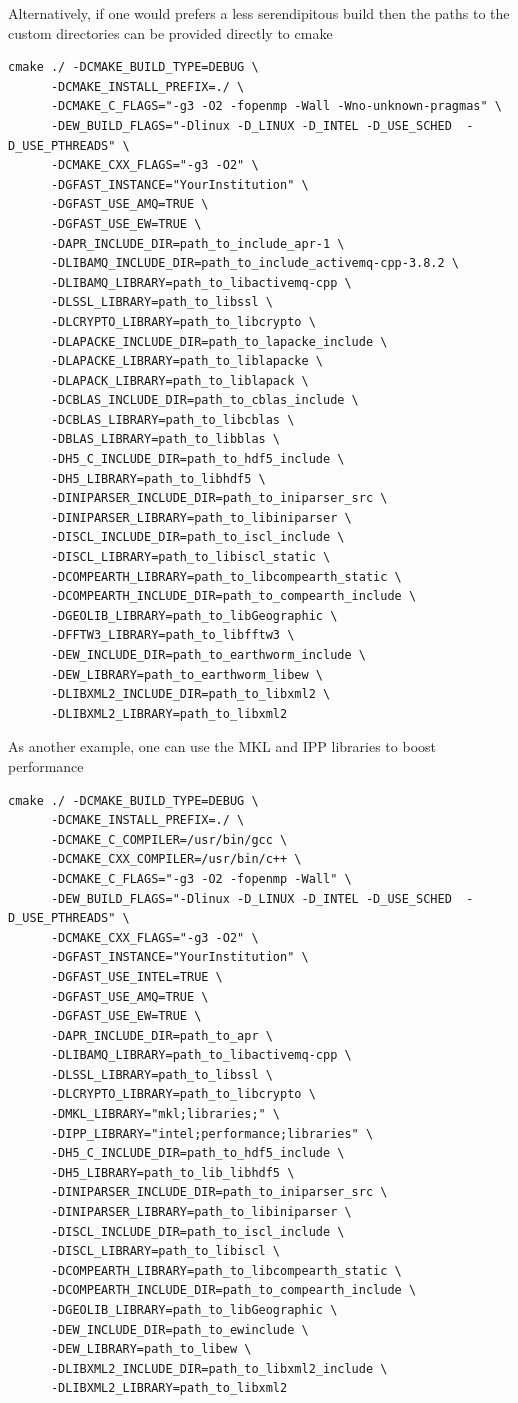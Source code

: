\documentclass[12pt]{article}
\begin{document}
Alternatively, if one would prefers a less serendipitous build then the paths to the custom
directories can be provided directly to cmake  
\begin{verbatim}
cmake ./ -DCMAKE_BUILD_TYPE=DEBUG \
      -DCMAKE_INSTALL_PREFIX=./ \
      -DCMAKE_C_FLAGS="-g3 -O2 -fopenmp -Wall -Wno-unknown-pragmas" \
      -DEW_BUILD_FLAGS="-Dlinux -D_LINUX -D_INTEL -D_USE_SCHED  -D_USE_PTHREADS" \
      -DCMAKE_CXX_FLAGS="-g3 -O2" \
      -DGFAST_INSTANCE="YourInstitution" \
      -DGFAST_USE_AMQ=TRUE \
      -DGFAST_USE_EW=TRUE \      
      -DAPR_INCLUDE_DIR=path_to_include_apr-1 \
      -DLIBAMQ_INCLUDE_DIR=path_to_include_activemq-cpp-3.8.2 \
      -DLIBAMQ_LIBRARY=path_to_libactivemq-cpp \
      -DLSSL_LIBRARY=path_to_libssl \
      -DLCRYPTO_LIBRARY=path_to_libcrypto \
      -DLAPACKE_INCLUDE_DIR=path_to_lapacke_include \
      -DLAPACKE_LIBRARY=path_to_liblapacke \
      -DLAPACK_LIBRARY=path_to_liblapack \
      -DCBLAS_INCLUDE_DIR=path_to_cblas_include \
      -DCBLAS_LIBRARY=path_to_libcblas \
      -DBLAS_LIBRARY=path_to_libblas \
      -DH5_C_INCLUDE_DIR=path_to_hdf5_include \
      -DH5_LIBRARY=path_to_libhdf5 \
      -DINIPARSER_INCLUDE_DIR=path_to_iniparser_src \
      -DINIPARSER_LIBRARY=path_to_libiniparser \
      -DISCL_INCLUDE_DIR=path_to_iscl_include \
      -DISCL_LIBRARY=path_to_libiscl_static \
      -DCOMPEARTH_LIBRARY=path_to_libcompearth_static \
      -DCOMPEARTH_INCLUDE_DIR=path_to_compearth_include \
      -DGEOLIB_LIBRARY=path_to_libGeographic \
      -DFFTW3_LIBRARY=path_to_libfftw3 \
      -DEW_INCLUDE_DIR=path_to_earthworm_include \
      -DEW_LIBRARY=path_to_earthworm_libew \
      -DLIBXML2_INCLUDE_DIR=path_to_libxml2 \
      -DLIBXML2_LIBRARY=path_to_libxml2
\end{verbatim}
As another example, one can use the MKL and IPP libraries to boost performance 
\begin{verbatim}
cmake ./ -DCMAKE_BUILD_TYPE=DEBUG \
      -DCMAKE_INSTALL_PREFIX=./ \
      -DCMAKE_C_COMPILER=/usr/bin/gcc \
      -DCMAKE_CXX_COMPILER=/usr/bin/c++ \
      -DCMAKE_C_FLAGS="-g3 -O2 -fopenmp -Wall" \
      -DEW_BUILD_FLAGS="-Dlinux -D_LINUX -D_INTEL -D_USE_SCHED  -D_USE_PTHREADS" \
      -DCMAKE_CXX_FLAGS="-g3 -O2" \
      -DGFAST_INSTANCE="YourInstitution" \
      -DGFAST_USE_INTEL=TRUE \
      -DGFAST_USE_AMQ=TRUE \
      -DGFAST_USE_EW=TRUE \      
      -DAPR_INCLUDE_DIR=path_to_apr \
      -DLIBAMQ_LIBRARY=path_to_libactivemq-cpp \
      -DLSSL_LIBRARY=path_to_libssl \
      -DLCRYPTO_LIBRARY=path_to_libcrypto \
      -DMKL_LIBRARY="mkl;libraries;" \
      -DIPP_LIBRARY="intel;performance;libraries" \
      -DH5_C_INCLUDE_DIR=path_to_hdf5_include \
      -DH5_LIBRARY=path_to_lib_libhdf5 \
      -DINIPARSER_INCLUDE_DIR=path_to_iniparser_src \
      -DINIPARSER_LIBRARY=path_to_libiniparser \
      -DISCL_INCLUDE_DIR=path_to_iscl_include \
      -DISCL_LIBRARY=path_to_libiscl \
      -DCOMPEARTH_LIBRARY=path_to_libcompearth_static \
      -DCOMPEARTH_INCLUDE_DIR=path_to_compearth_include \      
      -DGEOLIB_LIBRARY=path_to_libGeographic \
      -DEW_INCLUDE_DIR=path_to_ewinclude \
      -DEW_LIBRARY=path_to_libew \
      -DLIBXML2_INCLUDE_DIR=path_to_libxml2_include \
      -DLIBXML2_LIBRARY=path_to_libxml2
\end{verbatim}
\end{document}
